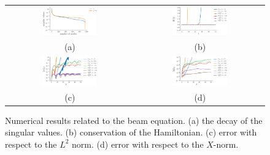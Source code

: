 \begin{figure} \label{fig:1}
\begin{tabular}{cc}
\includegraphics[width=0.45\textwidth]{./figs/beam/singulars} & \includegraphics[width=0.45\textwidth]{./figs/beam/energy} \\
(a) & (b) \\
\includegraphics[width=0.45\textwidth]{./figs/beam/l2_norm} & \includegraphics[width=0.45\textwidth]{./figs/beam/energy_norm} \\
(c) & (d) \\
\end{tabular}
\caption{Numerical results related to the beam equation. (a) the decay of the singular values. (b) conservation of the Hamiltonian. (c) error with respect to the $L^2$ norm. (d) error with respect to the $X$-norm.}
\end{figure}

